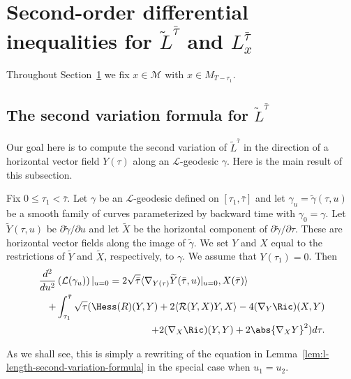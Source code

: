 \section{Second-order differential inequalities for $\widetilde L^{\bar\tau}$
and $L_x^{\bar\tau}$}\label{secondorder}

Throughout Section~\ref{secondorder} we fix $x\in {\mathcal M}$ with $x\in
M_{T-\tau_1}$.


\subsection{The second variation formula for $\widetilde L^{\bar\tau}$}

Our goal here is to compute the second variation of $\widetilde
L^{\bar\tau}$ in the direction of a horizontal vector field
$Y(\tau)$ along an ${\mathcal L}$-geodesic $\gamma$. Here is the
main result of this subsection.

\begin{proposition}\label{prop:l-length-second-variation-general}
\label{2ndvariation}
 Fix $0\le \tau_1<\bar \tau$.
Let $\gamma$ be an ${\mathcal L}$-geodesic defined on
$[\tau_1,\bar\tau]$ and let $\gamma_u=\widetilde\gamma(\tau,u)$ be a
smooth family of curves parameterized by backward time with
$\gamma_0=\gamma$. Let $\widetilde Y(\tau,u)$ be $\partial
\widetilde\gamma/\partial u$ and let $\widetilde X$ be the
horizontal component of $\partial \widetilde \gamma/\partial \tau$.
These are horizontal vector fields along the image of $\widetilde
\gamma$. We set $Y$ and $X$ equal to the restrictions of $\widetilde
Y$ and $\widetilde X$, respectively, to $\gamma$. We assume that
$Y(\tau_1)=0$. Then
\begin{eqnarray*}
\lefteqn{\frac{d^2}{du^2}\left({\mathcal L}(\gamma_u)\right)|_{u=0}
 =  2\sqrt{\bar\tau}\langle \nabla_{Y(\tau)}\widetilde
Y(\bar\tau,u)|_{u=0},X(\bar\tau)\rangle } \\
& & + \int_{\tau_1}^{\bar\tau}\sqrt{\tau}(\Hess(R)(Y,Y)
        +2\langle{\mathcal R}(Y,X)Y,X\rangle
        - 4(\nabla_{Y}\Ric)(X,Y) \\
        & &  + 2(\nabla_{X}\Ric)(Y,Y)+ 2\abs{\nabla_{X} Y}^{2})d\tau.
\end{eqnarray*}
\end{proposition}


As we shall see, this is simply a rewriting of the equation in
Lemma~\ref{lem:l-length-second-variation-formula} in the special case when $u_1=u_2$.



